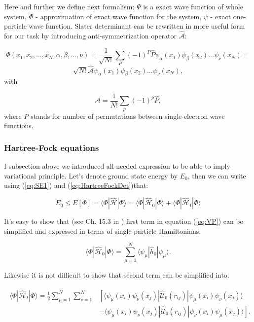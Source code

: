 \documentclass[10pt]{article}
\newcommand*{\hatH}{\hat{\mathcal{H}}}
\newcommand*{\hatU}{\hat{\mathcal{U}}}
\newcommand*{\hatA}{\hat{\mathcal{A}}}
\begin{document}
Here and further we define next formalism:  $\Psi$ is a exact wave function of whole system, $\Phi$ - approximation of exact wave function for the system, $\psi$ - exact one-particle wave function. Slater determinant can be rewritten in more useful form for our task by introducing anti-symmetrization operator $\hatA$:

\[
 \Phi(x_1,x_2,\dots,x_N,\alpha,\beta,\dots,\nu) = \frac{1}{\sqrt{N!}}\sum_{P} (-1)^P\hat{P}\psi_{\alpha}(x_1)
    \psi_{\beta}(x_2)\dots\psi_{\nu}(x_N)=
\]
\[ 
    \sqrt{N!}\hatA\psi_{\alpha}(x_1)
    \psi_{\beta}(x_2)\dots\psi_{\nu}(x_N),
\]
with 

\begin{equation}
  \hatA = \frac{1}{N!}\sum_{p} (-1)^p\hat{P},
\label{antiSymmetryOperator}
\end{equation}
where $P$ stands for number of permutations between single-electron wave functions.


\subsubsection{Hartree-Fock equations}
I subsection above we introduced all needed expression to be able to imply variational principle. Let's denote ground state energy by $E_0$, then we can write using (\ref{eq:SE1}) and (\ref{eq:HartreeFockDet})that:
 
\begin{equation}\label{eq:VP}
E_0 \le E[\Phi] = \langle \Phi|\hatH|\Phi\rangle = \langle \Phi|\hatH_0|\Phi\rangle + \langle \Phi|\hatH_I|\Phi\rangle
\end{equation}

It's easy to show that (see Ch. 15.3 in \cite{one}) first term in equation (\ref{eq:VP}) can be simplified and expressed in terms of single particle Hamiltonians:

\begin{equation}
\langle \Phi|\hatH_0|\Phi\rangle  = \sum_{\mu=1}^N \langle \psi_{\mu} | \hat{h}_0 | \psi_{\mu} \rangle.
\label{eq:fun1}
\end{equation}

Likewise it is not difficult to show that second term can be simplified into:

\begin{align}
\begin{split}
  \langle \Phi|\hatH_I|\Phi\rangle 
  = \frac{1}{2}\sum_{\mu=1}^N\sum_{\nu=1}^N
    &\left[ \langle \psi_{\mu}(x_i)\psi_{\nu}(x_j)|\hatU_{0}(r_{ij})|\psi_{\mu}(x_i)\psi_{\nu}(x_j)\rangle
    \right.
\label{eq:fun2}\\
  &\left.
  - \langle \psi_{\mu}(x_i)\psi_{\nu}(x_j)
  |\hatU_{0}(r_{ij})|\psi_{\nu}(x_i)\psi_{\mu}(x_j)\rangle
  \right]. 
\end{split}
\end{align}
\end{document}
